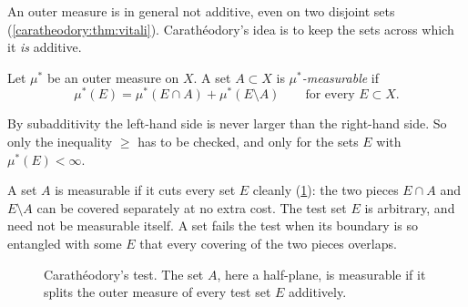 \begin{notechapter}
An outer measure is in general not additive, even on two disjoint sets
(\cref{caratheodory:thm:vitali}). Carath\'eodory's idea is to keep the
sets across which it \emph{is} additive.

\begin{definition}\label{caratheodory:def:measurable}
Let $\mu^*$ be an outer measure on $X$. A set $A\subset X$ is
\emph{$\mu^*$-measurable} if
\[
  \mu^*(E) = \mu^*(E\cap A) + \mu^*(E\setminus A)
  \qquad\text{for every }E\subset X .
\]
\end{definition}

By subadditivity the left-hand side is never larger than the right-hand
side. So only the inequality $\geq$ has to be checked, and only for the
sets $E$ with $\mu^*(E) < \infty$.

\begin{intuition}
A set $A$ is measurable if it cuts every set $E$ cleanly
(\cref{caratheodory:fig:test}): the two pieces $E\cap A$ and
$E\setminus A$ can be covered separately at no extra cost. The test set
$E$ is arbitrary, and need not be measurable itself. A set fails the
test when its boundary is so entangled with some $E$ that every
covering of the two pieces overlaps.
\end{intuition}

\begin{figure}[ht]
\centering
{}
\caption{Carath\'eodory's test. The set $A$, here a half-plane, is
measurable if it splits the outer measure of every test set $E$
additively.}
\label{caratheodory:fig:test}
\end{figure}


\end{notechapter}
